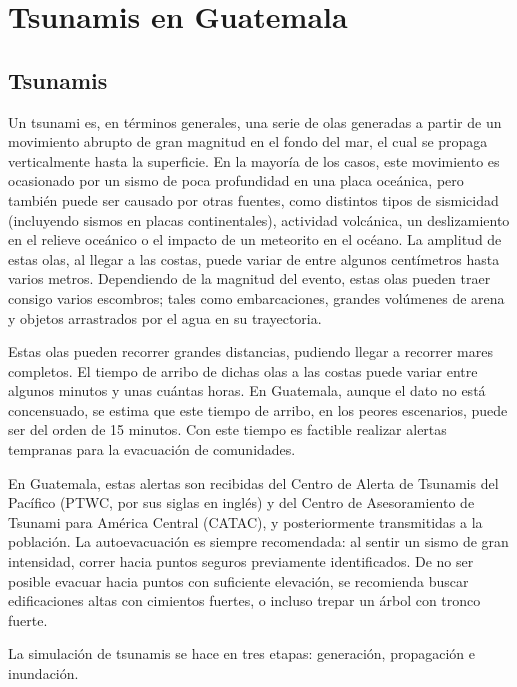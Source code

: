 %
\chapter{Tsunamis en Guatemala}

\section{Tsunamis}
Un tsunami es, en términos generales, una serie de olas generadas a partir de un movimiento abrupto de gran magnitud en el fondo del mar, el cual se propaga verticalmente hasta la superficie\cite{tsunamiGlossary}. En la mayoría de los casos, este movimiento es ocasionado por un sismo de poca profundidad en una placa oceánica, pero también puede ser causado por otras fuentes, como distintos tipos de sismicidad (incluyendo sismos en placas continentales), actividad volcánica, un deslizamiento en el relieve oceánico o el impacto de un meteorito en el océano\cite{posterGlobal, posterCA, OLoughlin_etal2013}.
La amplitud de estas olas, al llegar a las costas, puede variar de entre algunos centímetros hasta varios metros.
Dependiendo de la magnitud del evento, estas olas pueden traer consigo varios escombros; tales como embarcaciones, grandes volúmenes de arena y objetos arrastrados por el agua en su trayectoria\cite{tsunamiGlossary}.

Estas olas pueden recorrer grandes distancias, pudiendo llegar a recorrer mares completos\cite{tsunamiGlossary}. 
El tiempo de arribo de dichas olas a las costas puede variar entre algunos minutos y unas cu\'antas horas. En Guatemala, aunque el dato no está concensuado, se estima que este tiempo de arribo, en los peores escenarios, puede ser del orden de 15 minutos.
Con este tiempo es factible realizar alertas tempranas para la evacuación de comunidades.

En Guatemala, estas alertas son recibidas del Centro de Alerta de Tsunamis del Pacífico (PTWC, por sus siglas en inglés) y del Centro de Asesoramiento de Tsunami para América Central (CATAC), y posteriormente transmitidas a la población.
La autoevacuación es siempre recomendada\cite{PNR}: al sentir un sismo de gran intensidad, correr hacia puntos seguros previamente identificados. De no ser posible evacuar hacia puntos con suficiente elevación, se recomienda buscar edificaciones altas con cimientos fuertes, o incluso trepar un 
árbol con tronco fuerte\cite{lessonsIndonesia,lessonsCHJ}.


La simulación de tsunamis se hace en tres etapas: generación, propagación e inundación.

